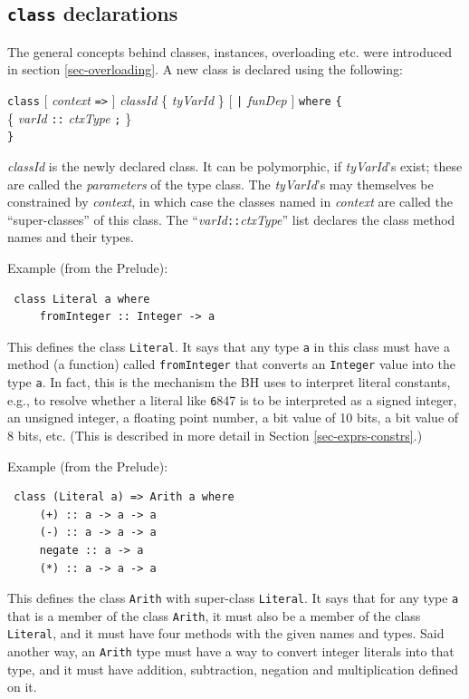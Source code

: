 \documentclass[twoside,letterpaper]{article}
\newcommand{\hm}{\hspace*{1em}}
\newcommand{\BH}{BH}
\newcommand{\te}[1]{\texttt{#1}}
\newcommand{\nterm}[1]{\emph{#1}}
\newcommand{\term}[1]{{\tt{#1}}}
\newcommand{\many}[1]{\{ #1 \}}
\newcommand{\opt}[1]{[ #1 ]}
\newcommand{\gram}[2]{    \hm\makebox[10em][l]{\it #1}\makebox[1.5em][l]{::=}    #2}
\newcommand{\grammore}[1]{\hm\makebox[10em][l]{      }\makebox[1.5em][l]{}       #1}
\begin{document}

\subsection{{\te{class}} declarations}

\label{sec-classes}

The general concepts behind classes, instances, overloading etc.
were introduced in section {\ref{sec-overloading}}.  A new class is
declared using the following:

\gram{topDefn}{\term{class} \opt{\nterm{context} \term{=>}} \nterm{classId} \many{\nterm{tyVarId}} \opt{\term{|} \nterm{funDep}}
        \term{where} \term{\{}} \\
\grammore{ \many{\nterm{varId} \term{::} \nterm{ctxType} \term{;}} } \\
\grammore{ \term{\}} }

{\nterm{classId}} is the newly declared class.  It can be polymorphic,
if {\nterm{tyVarId}}'s exist; these are called the {\emph{parameters}}
of the type class.  The {\nterm{tyVarId}}'s may themselves be
constrained by {\nterm{context}}, in which case the classes named in
{\nterm{context}} are called the ``super-classes'' of this class.  The
``{\nterm{varId}\term{::}\nterm{ctxType}}'' list declares the class
method names and their types.

Example (from the Prelude):
\begin{verbatim}
 class Literal a where
     fromInteger :: Integer -> a
\end{verbatim}
This defines the class {\te{Literal}}.  It says that any type {\te{a}}
in this class must have a method (a function) called
{\te{fromInteger}} that converts an {\te{Integer}} value into the type
{\te{a}}.  In fact, this is the mechanism the {\BH} uses to
interpret literal constants, e.g., to resolve whether a literal like
{\te 6847} is to be interpreted as a signed integer, an unsigned
integer, a floating point number, a bit value of 10 bits, a bit value
of 8 bits, etc.  (This is described in more detail in Section
\ref{sec-exprs-constrs}.)

Example (from the Prelude):
\begin{verbatim}
 class (Literal a) => Arith a where
     (+) :: a -> a -> a
     (-) :: a -> a -> a
     negate :: a -> a
     (*) :: a -> a -> a
\end{verbatim}
This defines the class {\te{Arith}} with super-class {\te{Literal}}.
It says that for any type {\te{a}} that is a member of the class
{\te{Arith}}, it must also be a member of the class {\te{Literal}},
and it must have four methods with the given names and types.  Said
another way, an {\te{Arith}} type must have a way to convert integer
literals into that type, and it must have addition, subtraction,
negation and multiplication defined on it.
\end{document}
